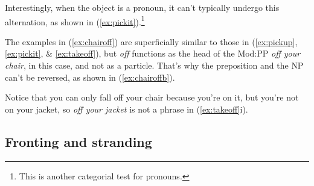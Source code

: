 \begin{multicols}{2}
\ea \label{ex:pickup}
    \ea \label{ex:pickupa}
    \z
    \ex \label{ex:pickupb}
        \z
    \z
\z
\end{multicols}
Interestingly, when the object is a pronoun, it can't typically undergo this alternation, as shown in (\ref{ex:pickit}).\footnote{This is another categorial test for pronouns.}

\begin{multicols}{2}
\ea \label{ex:pickit}
    \ea
    \z
    \ex
        \z
    \z
\z
\end{multicols}

The examples in (\ref{ex:chairoff}) are superficially similar to those in (\ref{ex:pickup}, \ref{ex:pickit}, \& \ref{ex:takeoff}), but \textit{off} functions as the head of the Mod:PP \textit{off your chair}, in this case, and not as a particle. That's why the preposition and the NP can't be reversed, as shown in (\ref{ex:chairoffb}).

\begin{multicols}{2}
\ea
    \ea \label{ex:takeoff}
    \z
    \ex \label{ex:chairoff}
        \label{ex:chairoffb}
        \z
    \z
\z
\end{multicols}

Notice that you can only fall off your chair because you're on it, but you're not on your jacket, so \textit{off your jacket} is not a phrase in (\ref{ex:takeoff}i).

\subsection{Fronting and stranding} \label{sec:preposition-stranding}

